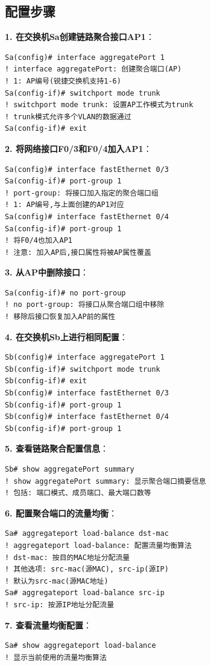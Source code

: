 \documentclass[12pt,a4paper]{ctexart}
\begin{document}
\subsection{配置步骤}

\begin{cmdbox}
\textbf{1. 在交换机Sa创建链路聚合接口AP1}：
\begin{lstlisting}
Sa(config)# interface aggregatePort 1
! interface aggregatePort: 创建聚合端口(AP)
! 1: AP编号(锐捷交换机支持1-6)
Sa(config-if)# switchport mode trunk
! switchport mode trunk: 设置AP工作模式为trunk
! trunk模式允许多个VLAN的数据通过
Sa(config-if)# exit
\end{lstlisting}

\textbf{2. 将网络接口F0/3和F0/4加入AP1}：
\begin{lstlisting}
Sa(config)# interface fastEthernet 0/3
Sa(config-if)# port-group 1
! port-group: 将接口加入指定的聚合端口组
! 1: AP编号,与上面创建的AP1对应
Sa(config)# interface fastEthernet 0/4
Sa(config-if)# port-group 1
! 将F0/4也加入AP1
! 注意: 加入AP后,接口属性将被AP属性覆盖
\end{lstlisting}

\textbf{3. 从AP中删除接口}：
\begin{lstlisting}
Sa(config-if)# no port-group
! no port-group: 将接口从聚合端口组中移除
! 移除后接口恢复加入AP前的属性
\end{lstlisting}

\textbf{4. 在交换机Sb上进行相同配置}：
\begin{lstlisting}
Sb(config)# interface aggregatePort 1
Sb(config-if)# switchport mode trunk
Sb(config-if)# exit
Sb(config)# interface fastEthernet 0/3
Sb(config-if)# port-group 1
Sb(config)# interface fastEthernet 0/4
Sb(config-if)# port-group 1
\end{lstlisting}

\textbf{5. 查看链路聚合配置信息}：
\begin{lstlisting}
Sb# show aggregatePort summary
! show aggregatePort summary: 显示聚合端口摘要信息
! 包括: 端口模式、成员端口、最大端口数等
\end{lstlisting}

\textbf{6. 配置聚合端口的流量均衡}：
\begin{lstlisting}
Sa# aggregateport load-balance dst-mac
! aggregateport load-balance: 配置流量均衡算法
! dst-mac: 按目的MAC地址分配流量
! 其他选项: src-mac(源MAC), src-ip(源IP)
! 默认为src-mac(源MAC地址)
Sa# aggregateport load-balance src-ip
! src-ip: 按源IP地址分配流量
\end{lstlisting}

\textbf{7. 查看流量均衡配置}：
\begin{lstlisting}
Sa# show aggregateport load-balance
! 显示当前使用的流量均衡算法
\end{lstlisting}
\end{cmdbox}
\end{document}
